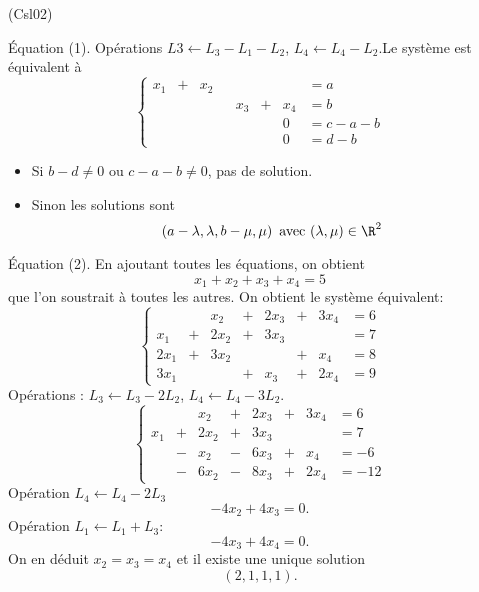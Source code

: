 \begin{tiny}(Csl02)\end{tiny}
\'Equation (1).\newline
Opérations $L3 \leftarrow L_3 - L_1 - L_2$, $L_4 \leftarrow L_4 - L_2$.\newline Le système est équivalent à
\begin{displaymath}
\left\lbrace 
\begin{alignedat}{5}
 x_1 & + & x_2 &   &     &   &      & = a\\
     &   &     &   & x_3 & + & x_4  & = b\\
     &   &     &   &     &   &  0   & = c - a - b \\
     &   &     &   &     &   &  0   & = d - b
\end{alignedat}
\right. 
\end{displaymath}
\begin{itemize}
 \item Si $b-d \neq 0$ ou $c -a - b \neq 0$, pas de solution.
 \item Sinon les solutions sont
\begin{displaymath}
 \left( a - \lambda, \lambda, b-\mu, \mu\right) \text{ avec } (\lambda,\mu)\in \R^2 
\end{displaymath}
\end{itemize}

\'Equation (2).
En ajoutant toutes les équations, on obtient
\[
  x_1 + x_2 + x_3 + x_4 = 5
\]
que l'on soustrait à toutes les autres. On obtient le système équivalent:
\[
\left\lbrace 
\begin{alignedat}{5}
     &   & x_2  & + & 2x_3 & + & 3x_4 & = 6\\
 x_1 & + & 2x_2 & + & 3x_3 &   &      & = 7\\
 2x_1 & + & 3x_2 &   &     & + &  x_4 & = 8\\
 3x_1 &   &      & + & x_3 & + & 2x_4 & = 9
\end{alignedat}
\right. 
\]
Opérations : $L_3 \leftarrow L_3 - 2L_2$, $L_4 \leftarrow L_4 - 3 L_2$.
\[
\left\lbrace 
\begin{alignedat}{5}
     &   & x_2  & + & 2x_3 & + & 3x_4 & = 6\\
 x_1 & + & 2x_2 & + & 3x_3 &   &      & = 7\\
     & - &  x_2 & - & 6x_3 & + &  x_4 & = -6\\
     & - & 6x_2 & - & 8x_3 & + & 2x_4 & = -12
\end{alignedat}
\right. 
\]
Opération $L_4 \leftarrow L_4 -2 L_3$
\[
  -4x_2 + 4x_3 = 0.
\]
Opération $L_1 \leftarrow L_1 + L_3$:
\[
  -4x_3 + 4x_4 = 0.
\]
On en déduit $x_2 = x_3 = x_4$ et il existe une unique solution 
\begin{displaymath}
 (2,1,1,1).
\end{displaymath}
